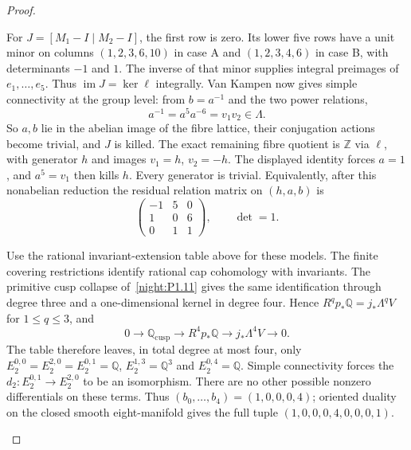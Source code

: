 \begin{proof}
\begin{enumerate}[label={$\langle1\rangle$\arabic*.}]
For $J=[M_1-I\mid M_2-I]$, the first row is zero. Its lower five
rows have a unit minor on columns $(1,2,3,6,10)$ in case A and
$(1,2,3,4,6)$ in case B, with determinants $-1$ and $1$.
The inverse of that minor supplies integral preimages of
$e_1,\ldots,e_5$. Thus
$\operatorname{im}J=\ker\ell$ integrally. Van Kampen now gives
simple connectivity at the group level: from $b=a^{-1}$ and the
two power relations,
\[
 a^{-1}=a^5a^{-6}=v_1v_2\in\Lambda.
\]
So $a,b$ lie in the abelian image of the fibre lattice, their
conjugation actions become trivial, and $J$ is killed. The exact
remaining fibre quotient is $\mathbb Z$ via $\ell$, with generator
$h$ and images $v_1=h$, $v_2=-h$. The displayed identity forces
$a=1$, and $a^5=v_1$ then kills $h$. Every generator is trivial.
Equivalently, after this nonabelian reduction the residual relation
matrix on $(h,a,b)$ is
\[
 \begin{pmatrix}-1&5&0\\1&0&6\\0&1&1\end{pmatrix},
 \qquad\det=1.
\]

Use the rational invariant-extension table above for these models. The finite covering restrictions identify
rational cap cohomology with invariants. The primitive cusp collapse
of~\ref{night:P1.11} gives the same identification through degree
three and a one-dimensional kernel in degree four. Hence
$R^q p_*\mathbb Q=j_*\Lambda^qV$ for $1\le q\le3$, and
\[
 0\longrightarrow\mathbb Q_{\mathrm{cusp}}
 \longrightarrow R^4p_*\mathbb Q
 \longrightarrow j_*\Lambda^4V\longrightarrow0.
\]
The table therefore leaves, in total degree at most four, only
$E_2^{0,0}=E_2^{2,0}=E_2^{0,1}=\mathbb Q$,
$E_2^{1,3}=\mathbb Q^3$ and $E_2^{0,4}=\mathbb Q$.
Simple connectivity forces the $d_2:E_2^{0,1}\to E_2^{2,0}$ to be an isomorphism. There are no
other possible nonzero differentials on these terms. Thus
$(b_0,\ldots,b_4)=(1,0,0,0,4)$; oriented duality on the closed
smooth eight-manifold gives the full tuple
$(1,0,0,0,4,0,0,0,1)$.
\end{enumerate}
\end{proof}




